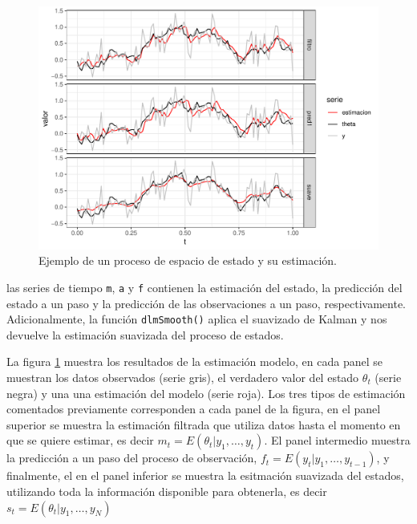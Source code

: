 \documentclass[12pt]{article}\usepackage[]{graphicx}\usepackage[]{color}
\makeatletter
\def\maxwidth{ %
  \ifdim\Gin@nat@width>\linewidth
    \linewidth
  \else
    \Gin@nat@width
  \fi
}
\newenvironment{knitrout}{}{} %
\makeatother
\begin{document}
\begin{knitrout}
\color{fgcolor}\begin{figure}

{\centering \includegraphics[width=\maxwidth]{figure/graf7b-1} 

}

\caption[Ejemplo de un proceso de espacio de estado y su estimación]{Ejemplo de un proceso de espacio de estado y su estimación.}\label{fig:graf7b}
\end{figure}


\end{knitrout}
las series de tiempo \verb|m|, \verb|a| y \verb|f| contienen la estimación del estado, la predicción del estado a un paso y la predicción de las observaciones a un paso, respectivamente. Adicionalmente, la función \verb|dlmSmooth()| aplica el suavizado de Kalman y nos devuelve la estimación suavizada del proceso de estados. 

La figura \ref{fig:graf7b} muestra los resultados de la estimación modelo, en cada panel se muestran los datos observados (serie gris), el verdadero valor del estado $\theta_t$ (serie negra) y una una estimación del modelo (serie roja). Los tres tipos de estimación comentados previamente corresponden a cada panel de la figura, en el panel superior se muestra la estimación filtrada que utiliza datos hasta el momento en que se quiere estimar, es decir $m_t = E(\theta_t | y_1,\ldots, y_t)$. El panel intermedio muestra la predicción a un paso del proceso de observación, $f_t = E(y_t | y_1, \ldots, y_{t-1})$, y finalmente, el en el panel inferior se muestra la esitmación suavizada del estados, utilizando toda la información disponible para obtenerla, es decir $s_t = E(\theta_t | y_1, \ldots, y_N)$
\end{document}
